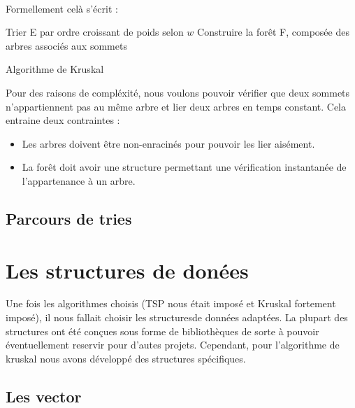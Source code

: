 \documentclass[a4paper]{article}
\begin{document}
\paragraph*{}
Formellement celà s'écrit :

\begin{algorithm}[H]
\SetAlgoLined
{}
Trier E par ordre croissant de poids selon $w$\;
Construire la forêt F, composée des arbres associés aux sommets\;
\caption{Algorithme de Kruskal}
\end{algorithm}

\medskip

Pour des raisons de compléxité, nous voulons pouvoir vérifier que deux sommets n'appartiennent pas au même arbre et lier deux arbres en temps constant. Cela entraine deux contraintes :
\begin{itemize}
\item Les arbres doivent être non-enracinés pour pouvoir les lier aisément.
\item La forêt doit avoir une structure permettant une vérification instantanée de l'appartenance à un arbre.
\end{itemize}

\subsection{Parcours de tries}

\section{Les structures de donées}

Une fois les algorithmes choisis (TSP nous était imposé et Kruskal fortement imposé), il nous fallait choisir les structuresde données adaptées. La plupart des structures ont été conçues sous forme de bibliothèques de sorte à pouvoir éventuellement reservir pour d'autes projets. Cependant, pour l'algorithme de kruskal nous avons développé des structures spécifiques.

\subsection{Les vector}
\end{document}
